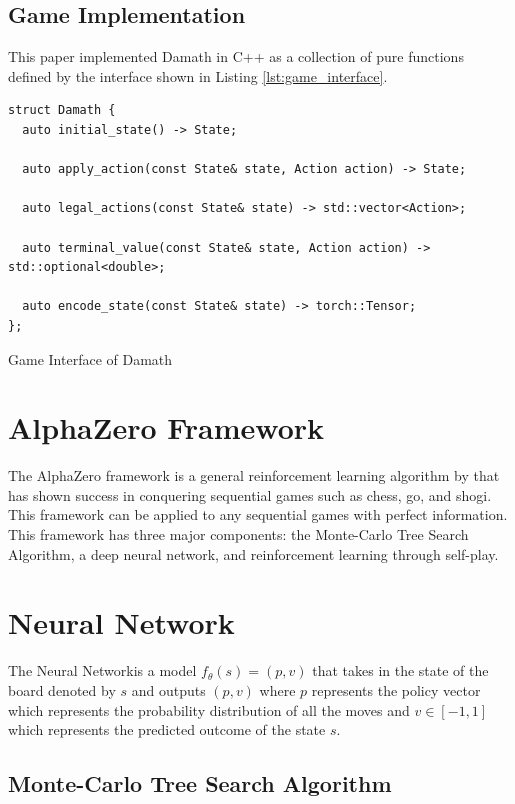 \subsection{Game Implementation}

This paper implemented Damath in C++ as a collection of pure functions defined by the interface shown in Listing \ref{lst:game_interface}.

\begin{listing}[htb]
\begin{verbatim}
struct Damath {
  auto initial_state() -> State;

  auto apply_action(const State& state, Action action) -> State;

  auto legal_actions(const State& state) -> std::vector<Action>;

  auto terminal_value(const State& state, Action action) -> std::optional<double>;

  auto encode_state(const State& state) -> torch::Tensor;
};
\end{verbatim}
\caption{Game Interface of Damath}



\label{lst:game_interface}
\end{listing}


\section{AlphaZero Framework}
The AlphaZero framework is a general reinforcement learning algorithm by \cite{silver2017masteringchessshogiselfplay} that has shown success in conquering sequential games such as chess, go, and shogi. This framework can be applied to any sequential games with perfect information. This framework has three major components: the Monte-Carlo Tree Search Algorithm, a deep neural network, and reinforcement learning through self-play.

\section{Neural Network}

The Neural Networkis a model $f_\theta(s) = (p,v)$ that takes in the state of the board denoted by $s$ and outputs $(p,v)$ where $p$ represents the policy vector which represents the probability distribution of all the moves and $v \in [-1, 1]$ which represents the predicted outcome of the state $s$.


\subsection{Monte-Carlo Tree Search Algorithm}


